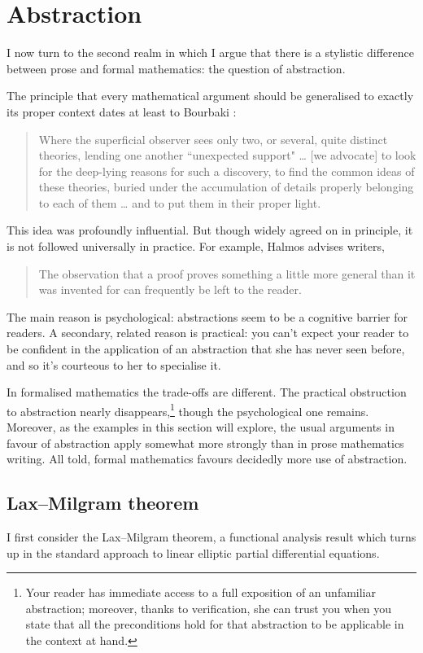 \documentclass[12pt]{llncs}
\begin{document}
\section{Abstraction} \label{sec:abstraction}




I now turn to the second realm in which I argue 
that there is a stylistic difference between prose and formal mathematics:
the question of abstraction.

The principle that every mathematical argument should be generalised to exactly its proper context
dates at least to Bourbaki \cite[section 2]{Bou50}:
\begin{quote}
Where the superficial observer sees only two, or several, quite
distinct theories, lending one another ``unexpected support"
\ldots
[we advocate]
to look for the deep-lying reasons for such a discovery, 
to find the common ideas of these theories,
buried under the accumulation of details properly belonging to each of them \ldots
and to put them in their proper light.
\end{quote}
This idea was profoundly influential.
But though widely agreed on in principle,
it is not followed universally in practice.
For example, Halmos \cite{Hal70} advises  writers,
\begin{quote}
  The observation that a proof proves something a little more general than it was invented for can frequently be left to the reader.
\end{quote}
The main reason is psychological:
abstractions seem to be a cognitive barrier for readers.
A secondary, related reason is practical:
you can't expect your reader to be confident in the application of an abstraction
that she has never seen before,
and so it's courteous to her to specialise it.

In formalised mathematics the trade-offs are different.
The practical obstruction to abstraction nearly disappears,\footnote{
Your reader has immediate access to a full exposition of an unfamiliar abstraction;
moreover, thanks to verification, she can trust you
when you state that all the preconditions hold for that abstraction to be applicable in the context at hand.}
though the psychological one remains.
Moreover, as the examples in this section will explore,
the usual arguments in favour of abstraction apply somewhat more strongly than in prose mathematics writing.
All told, formal mathematics favours decidedly more use of abstraction.


\subsection{Lax--Milgram theorem}
%
I first consider the Lax--Milgram theorem,
a functional analysis result
which turns up in the standard approach to linear elliptic partial differential equations.
\end{document}
